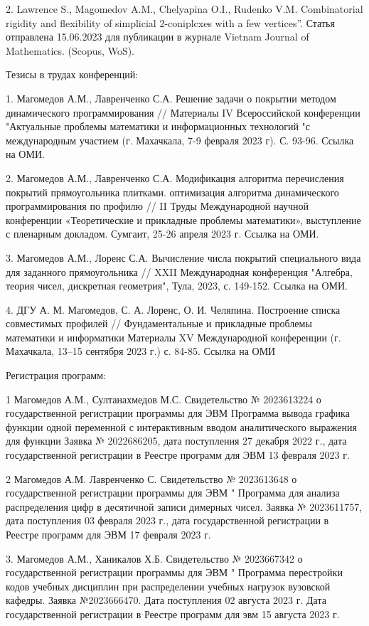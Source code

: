 2. Lawrence S., Magomedov A.M., Chelyapina O.I., Rudenko V.M. Combinatorial rigidity and flexibility of simplicial 2-coniplcxes with a few vertices”.
Статья отправлена 15.06.2023 для публикации в журнале Vietnam Journal of Mathematics. (Scopus, WoS).

Тезисы в трудах конференций:

1. Магомедов А.М., Лавренченко С.А. Решение задачи о покрытии методом динамического программирования // Материалы IV Всероссийской конференции "Актуальные проблемы математики и информационных технологий "с международным участием (г. Махачкала, 7-9 февраля 2023 г). С. 93-96.
Ссылка на ОМИ.

2. Магомедов А.М., Лавренченко С.А. Модификация алгоритма перечисления покрытий прямоугольника плитками. оптимизация алгоритма динамического программирования по профилю // II Труды Международной научной конференции «Теоретические и прикладные проблемы математики», выступление с пленарным докладом. Сумгаит, 25-26 апреля 2023 г.
Ссылка на ОМИ.

3. Магомедов А.М., Лоренс С.А. Вычисление числа покрытий специального вида для заданного прямоугольника // XXII Международная конференция "Алгебра, теория чисел, дискретная геометрия", Тула, 2023, с. 149-152.
Ссылка на ОМИ.

4. ДГУ А. М. Магомедов, С. А. Лоренс, О. И. Челяпина. Построение списка совместимых профилей // Фундаментальные и прикладные проблемы математики и информатики Материалы XV Международной конференции (г. Махачкала, 13–15 сентября 2023 г.) с. 84-85.
Ссылка на ОМИ

Регистрация программ:

1 Магомедов А.М., Султанахмедов М.С. Свидетельство № 2023613224 о государственной регистрации программы для ЭВМ Программа вывода графика функции одной переменной с интерактивным вводом аналитического выражения для функции Заявка № 2022686205, дата поступления 27 декабря 2022 г., дата государственной регистрации в Реестре программ для ЭВМ 13 февраля 2023 г. 

2 Магомедов А.М. Лавренченко С. Свидетельство № 2023613648 о государственной регистрации программы для ЭВМ " Программа для анализа распределения цифр в десятичной записи димерных чисел.  Заявка № 2023611757, дата поступления 03 февраля 2023 г., дата государственной регистрации в Реестре программ для ЭВМ 17 февраля 2023 г. 

3. Магомедов А.М., Ханикалов Х.Б. Свидетельство № 2023667342 о государственной регистрации программы для ЭВМ " Программа перестройки кодов учебных дисциплин при распределении учебных нагрузок вузовской кафедры. Заявка №2023666470. Дата поступления 02 августа 2023 г. Дата государственной регистрации в Реестре программ для эвм 15 августа 2023 г.

